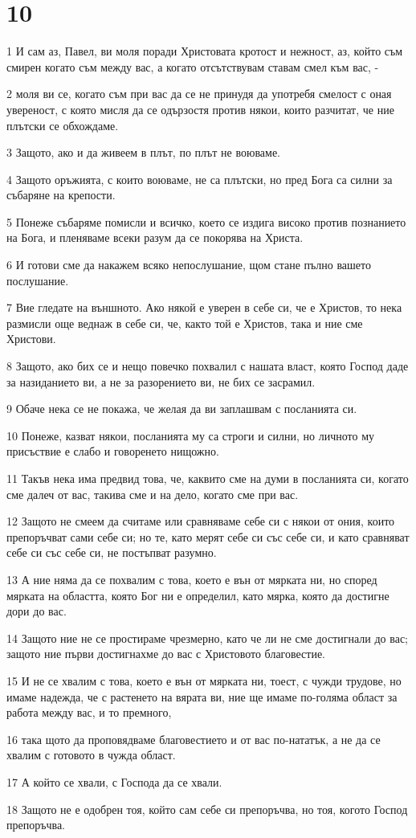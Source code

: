 \chapter{10}

\par 1 И сам аз, Павел, ви моля поради Христовата кротост и нежност, аз, който съм смирен когато съм между вас, а когато отсътствувам ставам смел към вас, -
\par 2 моля ви се, когато съм при вас да се не принудя да употребя смелост с оная увереност, с която мисля да се одързостя против някои, които разчитат, че ние плътски се обхождаме.
\par 3 Защото, ако и да живеем в плът, по плът не воюваме.
\par 4 Защото оръжията, с които воюваме, не са плътски, но пред Бога са силни за събаряне на крепости.
\par 5 Понеже събаряме помисли и всичко, което се издига високо против познанието на Бога, и пленяваме всеки разум да се покорява на Христа.
\par 6 И готови сме да накажем всяко непослушание, щом стане пълно вашето послушание.
\par 7 Вие гледате на външното. Ако някой е уверен в себе си, че е Христов, то нека размисли още веднаж в себе си, че, както той е Христов, така и ние сме Христови.
\par 8 Защото, ако бих се и нещо повечко похвалил с нашата власт, която Господ даде за назиданието ви, а не за разорението ви, не бих се засрамил.
\par 9 Обаче нека се не покажа, че желая да ви заплашвам с посланията си.
\par 10 Понеже, казват някои, посланията му са строги и силни, но личното му присъствие е слабо и говоренето нищожно.
\par 11 Такъв нека има предвид това, че, каквито сме на думи в посланията си, когато сме далеч от вас, такива сме и на дело, когато сме при вас.
\par 12 Защото не смеем да считаме или сравняваме себе си с някои от ония, които препоръчват сами себе си; но те, като мерят себе си със себе си, и като сравняват себе си със себе си, не постъпват разумно.
\par 13 А ние няма да се похвалим с това, което е вън от мярката ни, но според мярката на областта, която Бог ни е определил, като мярка, която да достигне дори до вас.
\par 14 Защото ние не се простираме чрезмерно, като че ли не сме достигнали до вас; защото ние първи достигнахме до вас с Христовото благовестие.
\par 15 И не се хвалим с това, което е вън от мярката ни, тоест, с чужди трудове, но имаме надежда, че с растенето на вярата ви, ние ще имаме по-голяма област за работа между вас, и то премного,
\par 16 така щото да проповядваме благовестието и от вас по-нататък, а не да се хвалим с готовото в чужда област.
\par 17 А който се хвали, с Господа да се хвали.
\par 18 Защото не е одобрен тоя, който сам себе си препоръчва, но тоя, когото Господ препоръчва.

